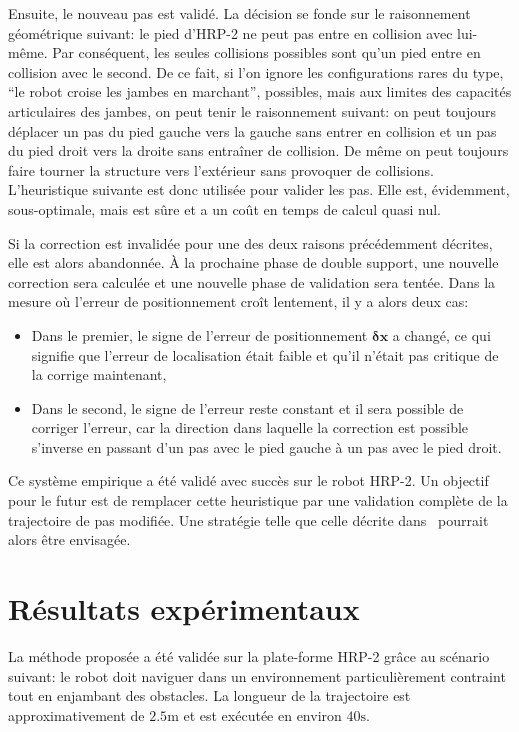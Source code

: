 Ensuite, le nouveau pas est validé. La décision se fonde sur le
raisonnement géométrique suivant: le pied d'HRP-2 ne peut pas entre en
collision avec lui-même. Par conséquent, les seules collisions
possibles sont qu'un pied entre en collision avec le second. De ce
fait, si l'on ignore les configurations rares du type, ``le robot
croise les jambes en marchant'', possibles, mais aux limites des
capacités articulaires des jambes, on peut tenir le raisonnement
suivant: on peut toujours déplacer un pas du pied gauche vers la
gauche sans entrer en collision et un pas du pied droit vers la droite
sans entraîner de collision. De même on peut toujours faire tourner la
structure vers l'extérieur sans provoquer de collisions. L'heuristique
suivante est donc utilisée pour valider les pas. Elle est, évidemment,
sous-optimale, mais est sûre et a un coût en temps de calcul quasi
nul.


Si la correction est invalidée pour une des deux raisons précédemment
décrites, elle est alors abandonnée. À la prochaine phase de double
support, une nouvelle correction sera calculée et une nouvelle phase
de validation sera tentée. Dans la mesure où l'erreur de
positionnement croît lentement, il y a alors deux cas:
\begin{itemize}
\item Dans le premier, le signe de l'erreur de positionnement
  $\mathbf{\delta {x}}$ a changé, ce qui signifie que l'erreur de
  localisation était faible et qu'il n'était pas critique de la
  corrige maintenant,
\item Dans le second, le signe de l'erreur reste constant et il sera
  possible de corriger l'erreur, car la direction dans laquelle la
  correction est possible s'inverse en passant d'un pas avec le pied
  gauche à un pas avec le pied droit.
\end{itemize}

Ce système empirique a été validé avec succès sur le robot HRP-2. Un
objectif pour le futur est de remplacer cette heuristique par une
validation complète de la trajectoire de pas modifiée. Une stratégie
telle que celle décrite dans \cite{10perrin.icra} pourrait alors être
envisagée.

\section{Résultats expérimentaux}\label{exp}


La méthode proposée a été validée sur la plate-forme
HRP-2 grâce au scénario suivant: le robot doit naviguer
dans un environnement particulièrement contraint tout en enjambant des
obstacles. La longueur de la trajectoire est approximativement de
$2.5\mathrm{m}$ et est exécutée en environ $40\mathrm{s}$.


